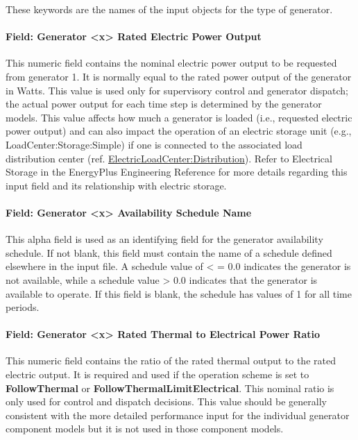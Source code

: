 These keywords are the names of the input objects for the type of generator.

\paragraph{Field: Generator \textless{}x\textgreater{} Rated Electric Power Output}\label{field-generator-x-rated-electric-power-output}

This numeric field contains the nominal electric power output to be requested from generator 1. It is normally equal to the rated power output of the generator in Watts. This value is used only for supervisory control and generator dispatch; the actual power output for each time step is determined by the generator models. This value affects how much a generator is loaded (i.e., requested electric power output) and can also impact the operation of an electric storage unit (e.g., LoadCenter:Storage:Simple) if one is connected to the associated load distribution center (ref. \hyperref[electricloadcenterdistribution]{ElectricLoadCenter:Distribution}). Refer to Electrical Storage in the EnergyPlus Engineering Reference for more details regarding this input field and its relationship with electric storage.

\paragraph{Field: Generator \textless{}x\textgreater{} Availability Schedule Name}\label{field-generator-x-availability-schedule-name}

This alpha field is used as an identifying field for the generator availability schedule. If not blank, this field must contain the name of a schedule defined elsewhere in the input file. A schedule value of \textless{} = 0.0 indicates the generator is not available, while a schedule value \textgreater{} 0.0 indicates that the generator is available to operate. If this field is blank, the schedule has values of 1 for all time periods.

\paragraph{Field: Generator \textless{}x\textgreater{} Rated Thermal to Electrical Power Ratio}\label{field-generator-x-rated-thermal-to-electrical-power-ratio}

This numeric field contains the ratio of the rated thermal output to the rated electric output. It is required and used if the operation scheme is set to \textbf{FollowThermal} or \textbf{FollowThermalLimitElectrical}. This nominal ratio is only used for control and dispatch decisions. This value should be generally consistent with the more detailed performance input for the individual generator component models but it is not used in those component models.

